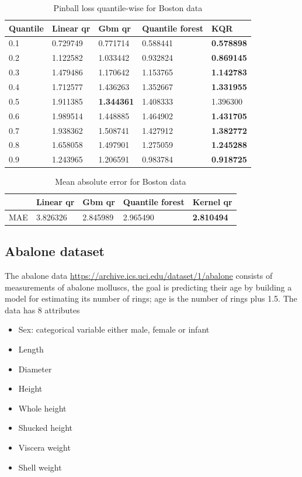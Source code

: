 \begin{table}
    \caption{Pinball loss quantile-wise for Boston data}
\begin{tabular}{lllll}
\toprule
  Quantile  & Linear qr & Gbm qr & Quantile forest & KQR \\
\midrule
0.1 & 0.729749 & 0.771714 & 0.588441 & \textbf{0.578898} \\
0.2 & 1.122582 & 1.033442 & 0.932824 & \textbf{0.869145} \\
0.3 & 1.479486 & 1.170642 & 1.153765 & \textbf{1.142783} \\
0.4 & 1.712577 & 1.436263 & 1.352667 & \textbf{1.331955} \\
0.5 & 1.911385 & \textbf{1.344361} & 1.408333 & 1.396300 \\
0.6 & 1.989514 & 1.448885 & 1.464902 & \textbf{1.431705} \\
0.7 & 1.938362 & 1.508741 & 1.427912 & \textbf{1.382772} \\
0.8 & 1.658058 & 1.497901 & 1.275059 & \textbf{1.245288} \\
0.9 & 1.243965 & 1.206591 & 0.983784 & \textbf{0.918725} \\
\bottomrule
\end{tabular}
\end{table}
        
\begin{table}
\caption{Mean absolute error for Boston data}    
\begin{tabular}{lllll}
\toprule
    & Linear qr & Gbm qr & Quantile forest & Kernel qr \\
\midrule
MAE & 3.826326 & 2.845989 & 2.965490 & \textbf{2.810494} \\
\bottomrule
\end{tabular}

\end{table}

\subsection{Abalone dataset}
The abalone data \href{https://archive.ics.uci.edu/dataset/1/abalone}{https://archive.ics.uci.edu/dataset/1/abalone} consists of measurements of abalone molluscs, the goal is predicting their age by building a model for estimating its number of rings; age is the number of rings plus 1.5.
The data has 8 attributes
\begin{itemize}
    \item Sex: categorical variable either male, female or infant
    \item Length
    \item Diameter
    \item Height
    \item Whole height
    \item Shucked height
    \item Viscera weight
    \item Shell weight
\end{itemize}

